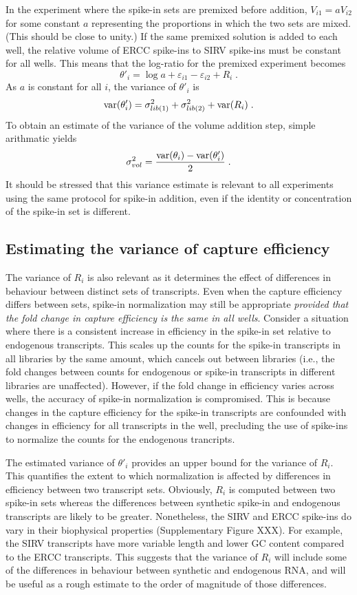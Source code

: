\documentclass{article}
\begin{document}
In the experiment where the spike-in sets are premixed before addition, $V_{i1}=aV_{i2}$ for some constant $a$ representing the proportions in which the two sets are mixed.
(This should be close to unity.)
If the same premixed solution is added to each well, the relative volume of ERCC spike-ins to SIRV spike-ins must be constant for all wells.
This means that the log-ratio for the premixed experiment becomes
\[
\theta'_i = \log a + \varepsilon_{i1} - \varepsilon_{i2} + R_i \;.
\]
As $a$ is constant for all $i$, the variance of $\theta'_i$ is
\[
\mbox{var}(\theta'_i) = \sigma^2_{lib(1)} + \sigma^2_{lib(2)} + \mbox{var}(R_i) \;.
\]
To obtain an estimate of the variance of the volume addition step, simple arithmatic yields
\[
\sigma^2_{vol} = \frac{\mbox{var}(\theta_i) - \mbox{var}(\theta'_i)}{2} \;.
\]
It should be stressed that this variance estimate is relevant to all experiments using the same protocol for spike-in addition, even if the identity or concentration of the spike-in set is different.

\subsection{Estimating the variance of capture efficiency}
The variance of $R_i$ is also relevant as it determines the effect of differences in behaviour between distinct sets of transcripts.
Even when the capture efficiency differs between sets, spike-in normalization may still be appropriate \textit{provided that the fold change in capture efficiency is the same in all wells}.
Consider a situation where there is a consistent increase in efficiency in the spike-in set relative to endogenous transcripts.
This scales up the counts for the spike-in transcripts in all libraries by the same amount, which cancels out between libraries (i.e., the fold changes between counts for endogenous or spike-in transcripts in different libraries are unaffected).
However, if the fold change in efficiency varies across wells, the accuracy of spike-in normalization is compromised.
This is because changes in the capture efficiency for the spike-in transcripts are confounded with changes in efficiency for all transcripts in the well, precluding the use of spike-ins to normalize the counts for the endogenous trancripts.

The estimated variance of $\theta'_i$ provides an upper bound for the variance of $R_i$.
This quantifies the extent to which normalization is affected by differences in efficiency between two transcript sets.
Obviously, $R_i$ is computed between two spike-in sets whereas the differences between synthetic spike-in and endogenous transcripts are likely to be greater.
Nonetheless, the SIRV and ERCC spike-ins do vary in their biophysical properties (Supplementary Figure XXX).
For example, the SIRV transcripts have more variable length and lower GC content compared to the ERCC transcripts.
This suggests that the variance of $R_i$ will include some of the differences in behaviour between synthetic and endogenous RNA, and will be useful as a rough estimate to the order of magnitude of those differences.
\end{document}
